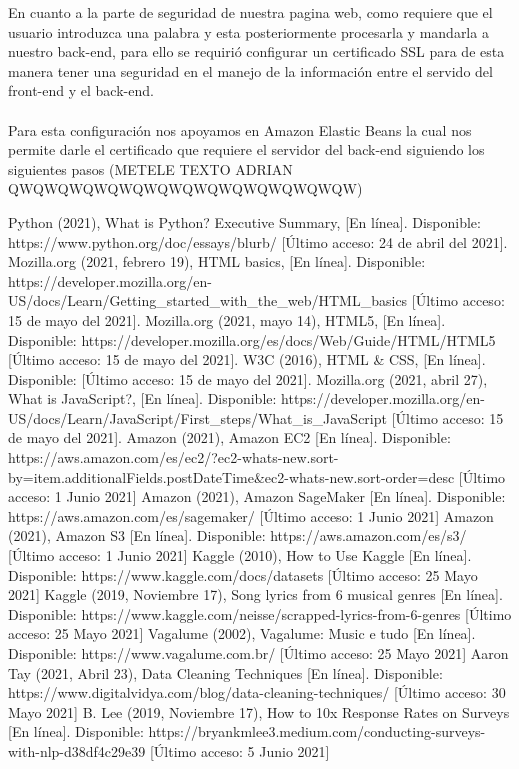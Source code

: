 \documentclass[12pt, a4paper, titlepage]{article}
\begin{document}
	
	En cuanto a la parte de seguridad de nuestra pagina web, como requiere que el usuario introduzca una palabra y esta posteriormente procesarla y mandarla a nuestro back-end, para ello se requirió configurar un certificado SSL para de esta manera tener una seguridad en el manejo de la información entre el servido del front-end y el back-end.\\\\
	Para esta configuración nos apoyamos en Amazon Elastic Beans la cual nos permite darle el certificado que requiere el servidor del back-end siguiendo los siguientes pasos (METELE TEXTO ADRIAN QWQWQWQWQWQWQWQWQWQWQWQWQWQW)
	\newpage
	\begin{thebibliography}{20}
		Python (2021), What is Python? Executive Summary, [En línea]. Disponible: https://www.python.org/doc/essays/blurb/ [Último acceso: 24 de abril del 2021].
		Mozilla.org (2021, febrero 19), HTML basics, [En línea]. Disponible: https://developer.mozilla.org/en-US/docs/Learn/Getting\_started\_with\_the\_web/HTML\_basics [Último acceso: 15 de mayo del 2021].
		Mozilla.org (2021, mayo 14), HTML5, [En línea]. Disponible: https://developer.mozilla.org/es/docs/Web/Guide/HTML/HTML5 [Último acceso: 15 de mayo del 2021].
		W3C (2016), HTML \& CSS, [En línea]. Disponible: [Último acceso: 15 de mayo del 2021].		
		Mozilla.org (2021, abril 27), What is JavaScript?, [En línea]. Disponible: https://developer.mozilla.org/en-US/docs/Learn/JavaScript/First\_steps/What\_is\_JavaScript [Último acceso: 15 de mayo del 2021].
		Amazon (2021), Amazon EC2 [En línea]. Disponible: https://aws.amazon.com/es/ec2/?ec2-whats-new.sort-by=item.additionalFields.postDateTime\&ec2-whats-new.sort-order=desc [Último acceso: 1 Junio 2021]		
		Amazon (2021), Amazon SageMaker [En línea]. Disponible: https://aws.amazon.com/es/sagemaker/ [Último acceso: 1 Junio 2021]		
		Amazon (2021), Amazon S3 [En línea]. Disponible: https://aws.amazon.com/es/s3/ [Último acceso: 1 Junio 2021]		
		Kaggle (2010), How to Use Kaggle [En línea]. Disponible: https://www.kaggle.com/docs/datasets [Último acceso: 25 Mayo 2021]
		Kaggle (2019, Noviembre 17), Song lyrics from 6 musical genres [En línea]. Disponible: https://www.kaggle.com/neisse/scrapped-lyrics-from-6-genres [Último acceso: 25 Mayo 2021]
		Vagalume (2002), Vagalume: Music e tudo [En línea]. Disponible: https://www.vagalume.com.br/ [Último acceso: 25 Mayo 2021]		
		Aaron Tay (2021, Abril 23), Data Cleaning Techniques [En línea]. Disponible: https://www.digitalvidya.com/blog/data-cleaning-techniques/ [Último acceso: 30 Mayo 2021]
		B. Lee (2019, Noviembre 17), How to 10x Response Rates on Surveys [En línea]. Disponible: https://bryankmlee3.medium.com/conducting-surveys-with-nlp-d38df4c29e39 [Último acceso: 5 Junio 2021]
		
	\end{thebibliography}	
\end{document}
